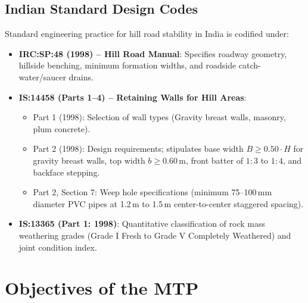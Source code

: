 \documentclass[12pt,a4paper]{report}
\begin{document}
\section{Indian Standard Design Codes}
Standard engineering practice for hill road stability in India is codified under:
\begin{itemize}
    \item \textbf{IRC:SP:48 (1998) -- Hill Road Manual}: Specifies roadway geometry, hillside benching, minimum formation widths, and roadside catch-water/saucer drains.
    \item \textbf{IS:14458 (Parts 1--4) -- Retaining Walls for Hill Areas}:
    \begin{itemize}
        \item Part 1 (1998): Selection of wall types (Gravity breast walls, masonry, plum concrete).
        \item Part 2 (1998): Design requirements; stipulates base width $B \ge 0.50 \cdot H$ for gravity breast walls, top width $b \ge 0.60\,\text{m}$, front batter of $1:3$ to $1:4$, and backface stepping.
        \item Part 2, Section 7: Weep hole specifications (minimum 75--100\,mm diameter PVC pipes at 1.2\,m to 1.5\,m center-to-center staggered spacing).
    \end{itemize}
    \item \textbf{IS:13365 (Part 1: 1998)}: Quantitative classification of rock mass weathering grades (Grade I Fresh to Grade V Completely Weathered) and joint condition index.
\end{itemize}

\newpage

\chapter{Objectives of the MTP}
\end{document}
